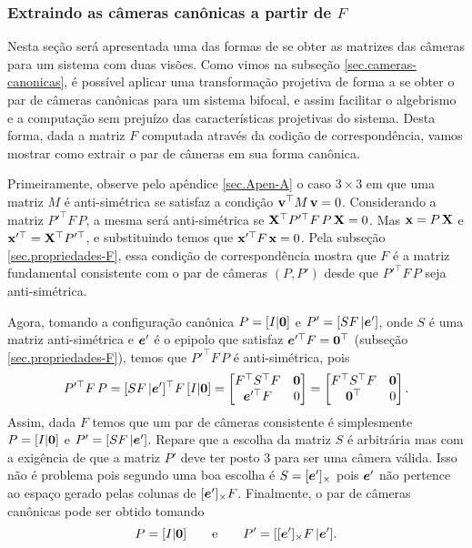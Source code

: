 \subsubsection*{Extraindo as câmeras canônicas a partir de $F$}
Nesta seção será apresentada uma das formas de se obter as matrizes das câmeras para um sistema com duas visões. Como vimos na subseção \ref{sec.cameras-canonicas}, é possível aplicar uma transformação projetiva de forma a se obter o par de câmeras canônicas para um sistema bifocal, e assim facilitar o algebrismo e a computação sem prejuízo das características projetivas do sistema. Desta forma, dada a matriz $F$ computada através da codição de correspondência, vamos mostrar como extrair o par de câmeras em sua forma canônica.

Primeiramente, observe pelo apêndice \ref{sec.Apen-A} o caso $3\times3$ em que uma matriz $M$ é anti-simétrica se satisfaz a condição ${\bf v}^\top M\,{\bf v}=0$. Considerando a matriz $P'^\top F\,P$, a mesma será anti-simétrica se $\mathbf{X}^\top P'^\top F\,P\,\mathbf{X}=0$. Mas $\mathbf{x}=P\,\mathbf{X}$ e $\mathbf{x}'^\top=\mathbf{X}^\top P'^\top$, e substituindo temos que $\mathbf{x}'^\top F\,\mathbf{x}=0$. Pela subseção \ref{sec.propriedades-F}, essa condição de correspondência mostra que $F$ é a matriz fundamental consistente com o par de câmeras $(P,P')$ desde que $P'^\top F\,P$ seja anti-simétrica.

Agora, tomando a configuração canônica $P=[I|{\bf 0}]$ e $P'=[SF\,|\boldsymbol{e}']$, onde $S$ é uma matriz anti-simétrica e $\boldsymbol{e}'$ é o epipolo que satisfaz $\boldsymbol{e}'^\top F={\bf 0}^\top$ (subseção \ref{sec.propriedades-F}), temos que $P'^\top F\,P$ é anti-simétrica, pois
\begin{equation*}
P'^\top F\,P=[SF\,|\boldsymbol{e}']^\top F\,[I|{\bf 0}]=
\begin{bmatrix}
F^\top S^\top F&{\bf 0}\\
\boldsymbol{e}'^\top F&0
\end{bmatrix}=
\begin{bmatrix}
F^\top S^\top F&{\bf 0}\\
{\bf 0}^\top&0
\end{bmatrix}.
\end{equation*}
Assim, dada $F$ temos que um par de câmeras consistente é simplesmente $P=[I|{\bf 0}]$ e $P'=[SF\,|\boldsymbol{e}']$. Repare que a escolha da matriz $S$ é arbitrária mas com a exigência de que a matriz $P'$ deve ter posto 3 para ser uma câmera válida. Isso não é problema pois segundo \citep{luong} uma boa escolha é $S=[\boldsymbol{e}']_\times$ pois $\boldsymbol{e}'$ não pertence ao espaço gerado pelas colunas de $[\boldsymbol{e}']_\times F$. Finalmente, o par de câmeras canônicas pode ser obtido tomando 
\begin{equation}\label{eq.cameras-dada-F}
P=[I|{\bf 0}]\qquad\text{e}\qquad P'=[[\boldsymbol{e}']_\times F\,|\boldsymbol{e}'].
\end{equation}

